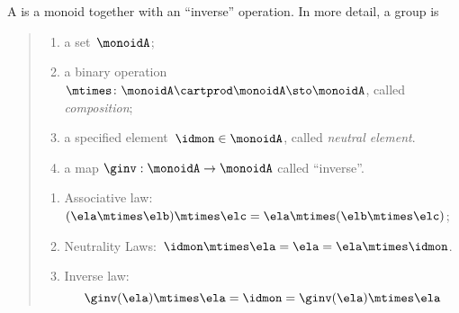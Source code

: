 

\section{}\label{sec:groups}


\begin{ctdefinition}[Group]
  \label{def:group}
  A \emph{} is a monoid together with an ``inverse'' operation.
  In more detail, a group is
  \begin{quote}
    \constit
    \begin{enumerate}
      \item a set~$\monoidA$;
      \item a binary operation~$\mtimes \colon \monoidA \cartprod \monoidA \sto \monoidA$, called \emph{composition};
      \item a specified element~$\idmon\in \monoidA$, called \emph{neutral element}.
      \item a map $\ginv: \monoidA \to \monoidA$ called ``inverse''.
    \end{enumerate}
    \condit
    \begin{enumerate}
      \item Associative law:~$(\ela\mtimes \elb)\mtimes \elc=\ela\mtimes (\elb\mtimes \elc)$;
      \item Neutrality Laws:~$\idmon\mtimes \ela=\ela=\ela \mtimes \idmon$.
      \item Inverse law:
      \begin{equation}
        \ginv(\ela) \mtimes \ela = \idmon = \ginv(\ela) \mtimes \ela
      \end{equation}
    \end{enumerate}
  \end{quote}
\end{ctdefinition}


